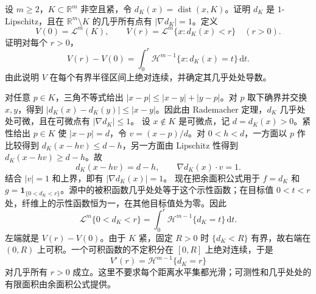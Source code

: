 \begin{exercise}\label{g3:ex:coarea-distance-neighborhood}
	设 \(m\ge2\)，\(K\subset\mathbb R^m\) 非空且紧，令 \(d_K(x)=\operatorname{dist}(x,K)\)。证明 \(d_K\) 是 \(1\)-Lipschitz，且在 \(\mathbb R^m\setminus K\) 的几乎所有点有 \(|\nabla d_K|=1\)。定义
	\[
		V(0)=\mathcal L^m(K),\qquad
		V(r)=\mathcal L^m\{x:d_K(x)<r\}\quad(r>0).
	\]
	证明对每个 \(r>0\)，
	\[
		V(r)-V(0)=\int_0^r\mathcal H^{m-1}\{x:d_K(x)=t\}\,\mathrm dt.
	\]
	由此说明 \(V\) 在每个有界半径区间上绝对连续，并确定其几乎处处导数。
\end{exercise}
\begin{solution}
	对任意 \(p\in K\)，三角不等式给出 \(|x-p|\le|x-y|+|y-p|\)。对 \(p\) 取下确界并交换 \(x,y\)，得到 \(|d_K(x)-d_K(y)|\le|x-y|\)。因此由 Rademacher 定理，\(d_K\) 几乎处处可微，且在可微点有 \(|\nabla d_K|\le1\)。
	设 \(x\notin K\) 是可微点，记 \(d=d_K(x)>0\)。紧性给出 \(p\in K\) 使 \(|x-p|=d\)，令 \(v=(x-p)/d\)。对 \(0<h<d\)，一方面以 \(p\) 作比较得到 \(d_K(x-hv)\le d-h\)，另一方面由 Lipschitz 性得到 \(d_K(x-hv)\ge d-h\)。故
	\[
		d_K(x-hv)=d-h,
		\qquad\nabla d_K(x)\cdot v=1.
	\]
	结合 \(|v|=1\) 和上界，即有 \(|\nabla d_K(x)|=1\)。
	现在把余面积公式用于 \(f=d_K\) 和 \(g=\mathbf1_{\{0<d_K<r\}}\)。源中的被积函数几乎处处等于这个示性函数；在目标值 \(0<t<r\) 处，纤维上的示性函数恒为一，在其他目标值处为零。因此
	\[
		\mathcal L^m\{0<d_K<r\}
		=\int_0^r\mathcal H^{m-1}\{d_K=t\}\,\mathrm dt.
	\]
	左端就是 \(V(r)-V(0)\)。由于 \(K\) 紧，固定 \(R>0\) 时 \(\{d_K<R\}\) 有界，故右端在 \((0,R)\) 上可积。一个可积函数的不定积分在 \([0,R]\) 上绝对连续，于是
	\[
		V'(r)=\mathcal H^{m-1}\{d_K=r\}
	\]
	对几乎所有 \(r>0\) 成立。这里不要求每个距离水平集都光滑；可测性和几乎处处的有限面积由余面积公式提供。
\end{solution}

